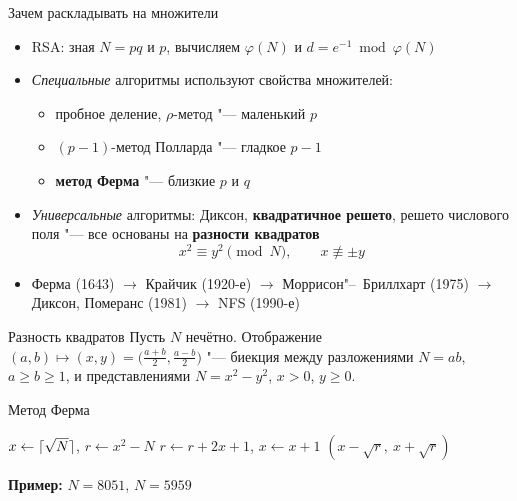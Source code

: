\documentclass{ca-slides}
\author{}
\begin{document}
\titleframe

\begin{canvasframe}{Зачем раскладывать на множители}
  \begin{itemize}
    \item RSA: зная $N = pq$ и $p$, вычисляем $\varphi(N)$ и $d = e^{-1} \bmod \varphi(N)$
    \item \emph{Специальные} алгоритмы используют свойства множителей:
    \begin{itemize}
      \item пробное деление, $\rho$-метод "--- маленький $p$
      \item $(p-1)$-метод Полларда "--- гладкое $p - 1$
      \item \textbf{метод Ферма} "--- близкие $p$ и $q$
    \end{itemize}
    \item \emph{Универсальные} алгоритмы: Диксон, \textbf{квадратичное решето}, решето
      числового поля "--- все основаны на \textbf{разности квадратов}
      \[x^2 \equiv y^2 \pmod N, \qquad x \not\equiv \pm y\]
    \item Ферма (1643) $\to$ Крайчик (1920-е) $\to$ Моррисон"--~Бриллхарт (1975) $\to$
      Диксон, Померанс (1981) $\to$ NFS (1990-е)
  \end{itemize}
\end{canvasframe}

\begin{theoremframe}[lemma]{Разность квадратов}
  Пусть $N$ нечётно. Отображение $(a, b) \mapsto (x, y) = \bigl(\frac{a+b}{2}, \frac{a-b}{2}\bigr)$
  "--- биекция между разложениями $N = ab$, $a \ge b \ge 1$, и представлениями
  $N = x^2 - y^2$, $x > 0$, $y \ge 0$.
\end{theoremframe}

\begin{canvasframe}{Метод Ферма}
  \begin{algorithm}
  \begin{algorithmic}[1]
  \State $x \gets \lceil\sqrt N\rceil$, \quad $r \gets x^2 - N$
    \State $r \gets r + 2x + 1$, \quad $x \gets x + 1$
  \EndWhile
  \State \Return $(x - \sqrt r,\ x + \sqrt r)$
  \end{algorithmic}
  \end{algorithm}
  \textbf{Пример:} $N = 8051$, \quad $N = 5959$
  \vfill
\end{canvasframe}
\end{document}
